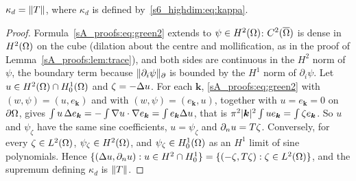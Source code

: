 \begin{lemma}\label{sA_proofs:lem:kappaT}
$\kappa_d=\lVert T\rVert$, where $\kappa_d$ is defined by~\eqref{s6_highdim:eq:kappa}.
\end{lemma}
\begin{proof}
Formula~\eqref{sA_proofs:eq:green2} extends to $\psi\in H^2(\Omega)$: $C^2(\overline{\Omega})$ is dense in
$H^2(\Omega)$ on the cube (dilation about the centre and mollification, as in the proof of
Lemma~\ref{sA_proofs:lem:trace}), and both sides are continuous in the $H^2$ norm of $\psi$, the
boundary term because $\lVert \partial_i\psi\rVert_{\partial}$ is bounded by the $H^1$ norm of $\partial_i\psi$. Let
$u\in H^2(\Omega)\cap H^1_0(\Omega)$ and $\zeta=-\Delta u$. For each $\boldsymbol k$,
\eqref{sA_proofs:eq:green2} with $(w,\psi)=(u,e_{\boldsymbol k})$ and with
$(w,\psi)=(e_{\boldsymbol k},u)$, together with $u=e_{\boldsymbol k}=0$ on $\partial\Omega$, gives
$\int u\,\Delta e_{\boldsymbol k}=-\int\nabla u\cdot\nabla e_{\boldsymbol k}=\int e_{\boldsymbol k}\Delta u$,
that is $\pi^2\lvert \boldsymbol k\rvert^2\int ue_{\boldsymbol k}=\int\zeta e_{\boldsymbol k}$. So $u$ and
$\psi_\zeta$ have the same sine coefficients, $u=\psi_\zeta$ and $\partial_n u=T\zeta$. Conversely, for
every $\zeta\in L^2(\Omega)$, $\psi_\zeta\in H^2(\Omega)$, and $\psi_\zeta\in H^1_0(\Omega)$ as an $H^1$
limit of sine polynomials. Hence
$\{(\Delta u,\partial_n u):u\in H^2\cap H^1_0\}=\{(-\zeta,T\zeta):\zeta\in L^2(\Omega)\}$, and the supremum
defining $\kappa_d$ is $\lVert T\rVert$.
\end{proof}

